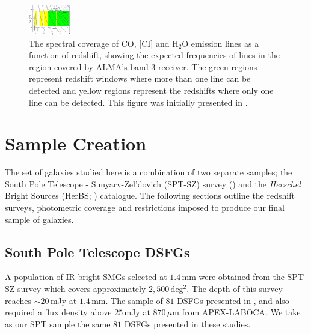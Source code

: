 \begin{figure}
	\centering
	\includegraphics[width=0.8\columnwidth]{Figures/redshift_ladder.pdf}
	\caption[Spectral coverage of molecular emission lines]{The spectral coverage of CO, [CI] and H$_2$O emission lines as a function of redshift, showing the expected frequencies of lines in the region covered by ALMA's band-3 receiver. The green regions represent redshift windows where more than one line can be detected and yellow regions represent the redshifts where only one line can be detected. This figure was initially presented in \citealt{Weiss_2013}.}
	\label{fig:redshift_ladder}
\end{figure}

\section{Sample Creation}

The set of galaxies studied here is a combination of two separate samples; the South Pole Telescope - Sunyarv-Zel'dovich (SPT-SZ) survey (\citealt{Vieira_2010, Mocanu_2013, Everett_2020}) and the \textit{Herschel} Bright Sources (HerBS; \citealt{Bakx_2018}) catalogue. The following sections outline the redshift surveys, photometric coverage and restrictions imposed to produce our final sample of galaxies.

\subsection{South Pole Telescope DSFGs}

A population of IR-bright SMGs selected at $1.4\,$mm were obtained from the SPT-SZ survey which covers approximately $2,500\,$deg$^2$. The depth of this survey reaches $\sim 20\,$mJy at $1.4\,$mm. The sample of $81$ DSFGs presented in \citealt{Weiss_2013}, \citealt{Strandet_2016} and \citealt{Reuter_2020} also required a flux density above $25\,$mJy at $870\,\mu$m from APEX-LABOCA. We take as our SPT sample the same $81$ DSFGs presented in these studies.

